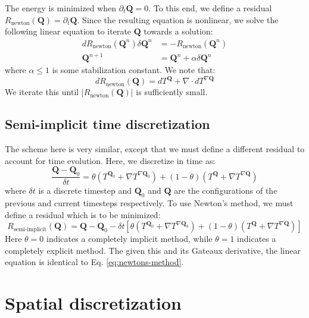 \documentclass[reqno]{article}
\newcommand{\Q}{\mathbf{Q}}
\begin{document}
The energy is minimized when $\partial_t \Q = 0$.
To this end, we define a residual $R_\text{newton} \left(\Q\right) = \partial_t \Q$.
Since the resulting equation is nonlinear, we solve the following linear equation to iterate $\Q$ towards a solution:
\begin{align} \label{eq:newtons-method}
    dR_\text{newton}\left(\Q^n \right) \delta \Q^n
    &=
    - R_\text{newton} \left( \Q^n \right) \\
    \Q^{n + 1}
    &=
    \Q^n + \alpha \delta \Q^n
\end{align}
where $\alpha \leq 1$ is some stabilization constant.
We note that:
\begin{equation}
    dR_\text{newton} \left( \Q \right)
    =
    dT^\Q + \nabla \cdot dT^{\nabla \Q}
\end{equation}
We iterate this until $\left| R_\text{newton}(\Q) \right|$ is sufficiently small.

\subsection{Semi-implicit time discretization}

The scheme here is very similar, except that we must define a different residual to account for time evolution.
Here, we discretize in time as:
\begin{equation}
    \frac{\Q - \Q_0}{\delta t}
    =
    \theta \left( T^{\Q_0} + \nabla T^{\nabla \Q_0} \right)
    + \left(1 - \theta\right) \left( T^{\Q} + \nabla T^{\nabla \Q} \right)
\end{equation}
where $\delta t$ is a discrete timestep and $\Q_0$ and $\Q$ are the configurations of the previous and current timesteps respectively.
To use Newton's method, we must define a residual which is to be minimized:
\begin{equation}
    R_\text{semi-implicit} \left( \Q \right)
    =
    \Q - \Q_0 
    - \delta t \left[
        \theta \left( T^{\Q_0} + \nabla T^{\nabla \Q_0} \right)
        + \left(1 - \theta\right) \left( T^{\Q} + \nabla T^{\nabla \Q} \right) 
    \right]
\end{equation}
Here $\theta = 0$ indicates a completely implicit method, while $\theta = 1$ indicates a completely explicit method.
The given this and its Gateaux derivative, the linear equation is identical to Eq. \eqref{eq:newtons-method}.

\section{Spatial discretization}
\end{document}

